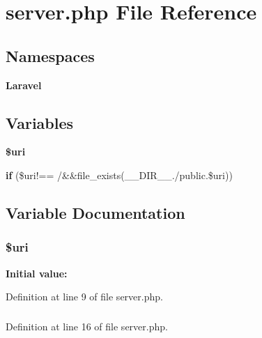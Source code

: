 \section{server.\+php File Reference}
\label{server_8php}
\subsection*{Namespaces}
\begin{DoxyCompactItemize}
\item 
 {\bf Laravel}
\end{DoxyCompactItemize}
\subsection*{Variables}
\begin{DoxyCompactItemize}
\item 
{\bf \$uri}
\item 
{\bf if} (\$uri!== \textquotesingle{}/\textquotesingle{}\&\&file\+\_\+exists(\+\_\+\+\_\+\+D\+I\+R\+\_\+\+\_\+.\textquotesingle{}/public\textquotesingle{}.\$uri))
\end{DoxyCompactItemize}


\subsection{Variable Documentation}
\subsubsection[{\$uri}]{\setlength{\rightskip}{0pt plus 5cm}\$uri}\label{server_8php_a653b5458163d338546c47271b4fb81b7}
{\bfseries Initial value\+:}


Definition at line 9 of file server.\+php.

\subsubsection[{if}]{}\label{server_8php_aa04beafd422e37287b6c79f9d0afde1e}


Definition at line 16 of file server.\+php.

